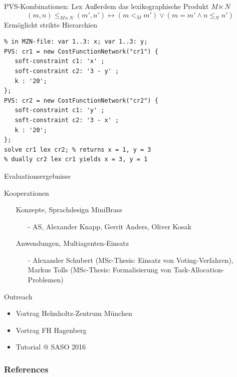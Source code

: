 \documentclass[handout,10pt,xcolor={dvipsnames},fleqn]{beamer}
\begin{document}
\begin{frame}[fragile]{PVS-Kombinationen: Lex}
Außerdem das \alert{lexikographische} Produkt $M \ltimes N$ 
\[
(m, n) \leq_{M \ltimes N} (m', n') \leftrightarrow (m <_M m') \vee (m = m' \wedge n \leq_N n')
\]
Ermöglicht strikte Hierarchien
\begin{lstlisting}
% in MZN-file: var 1..3: x; var 1..3: y;
PVS: cr1 = new CostFunctionNetwork("cr1") {
   soft-constraint c1: 'x' ;
   soft-constraint c2: '3 - y' ;
   k : '20';
}; 
PVS: cr2 = new CostFunctionNetwork("cr2") {
   soft-constraint c1: 'y' ;
   soft-constraint c2: '3 - x' ;
   k : '20';
};
solve cr1 lex cr2; % returns x = 1, y = 3
% dually cr2 lex cr1 yields x = 3, y = 1 
\end{lstlisting}
\end{frame}


\begin{frame}{Evaluationsergebnisse}

\end{frame}

\begin{frame}{Kooperationen}
\begin{itemize}
\item[] \alert{Konzepte, Sprachdesign MiniBrass}
\begin{itemize}
\item[-] AS, Alexander Knapp, Gerrit Anders, Oliver Kosak
\end{itemize}
\item[] \alert{Anwendungen, Multiagenten-Einsatz}
\begin{itemize}
\item[-] Alexander Schubert (MSc-Thesis: Einsatz von Voting-Verfahren), Markus Tolls (MSc-Thesis: Formalisierung von Task-Allocation-Problemen)
\end{itemize}
\end{itemize}
\end{frame}

\begin{frame}{Outreach}
\begin{itemize}
\item Vortrag Helmholtz-Zentrum München
\item Vortrag FH Hagenberg
\item Tutorial @ SASO 2016
\end{itemize}
\end{frame}



\begin{frame}[allowframebreaks]
        \frametitle{References}
        
        
\end{frame}
\end{document}
